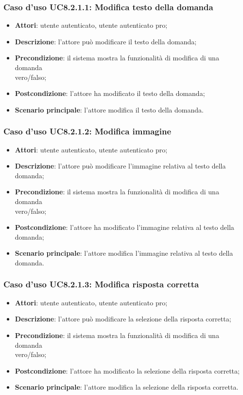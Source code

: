 \subsubsection{Caso d'uso UC8.2.1.1: Modifica testo della domanda}
	\begin{itemize}
		\item
			\textbf{Attori}: utente autenticato, utente autenticato pro;
		\item		
			\textbf{Descrizione}: l'attore può modificare il testo della domanda;
		\item
			\textbf{Precondizione}: il sistema mostra la funzionalità di modifica di una domanda \\vero/falso; 
		\item
			\textbf{Postcondizione}: l'attore ha modificato il testo della domanda;
		\item
			\textbf{Scenario principale}: l'attore modifica il testo della domanda. 
	\end{itemize}
	
\subsubsection{Caso d'uso UC8.2.1.2: Modifica immagine}
	\begin{itemize}
		\item
			\textbf{Attori}: utente autenticato, utente autenticato pro;
		\item		
			\textbf{Descrizione}: l'attore può modificare l'immagine relativa al testo della domanda;
		\item
			\textbf{Precondizione}: il sistema mostra la funzionalità di modifica di una domanda \\vero/falso; 
		\item
			\textbf{Postcondizione}: l'attore ha modificato l'immagine relativa al testo della domanda;
		\item
			\textbf{Scenario principale}: l'attore modifica l'immagine relativa al testo della domanda. 	
	\end{itemize}
	
\subsubsection{Caso d'uso UC8.2.1.3: Modifica risposta corretta}
	\begin{itemize}
		\item
			\textbf{Attori}: utente autenticato, utente autenticato pro;
		\item		
			\textbf{Descrizione}: l'attore può modificare la selezione della risposta corretta;
		\item
			\textbf{Precondizione}: il sistema mostra la funzionalità di modifica di una domanda \\vero/falso; 
		\item
			\textbf{Postcondizione}: l'attore ha modificato la selezione della risposta corretta;
		\item
			\textbf{Scenario principale}: l'attore modifica la selezione della risposta corretta.	 			
	\end{itemize}
	
